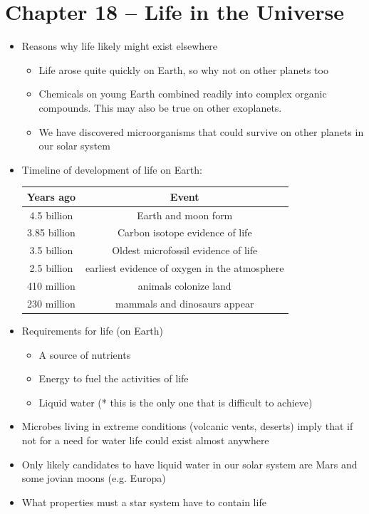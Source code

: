 \documentclass[12pt]{article}
\begin{document}
\section{Chapter 18 -- Life in the Universe}
\begin{itemize}
\item Reasons why life likely might exist elsewhere
\begin{itemize}
\item Life arose quite quickly on Earth, so why not on other planets too
\item Chemicals on young Earth combined readily into complex organic compounds.  This may also be true on other exoplanets.
\item We have discovered microorganisms that could survive on other planets in our solar system
\end{itemize}
\item Timeline of development of life on Earth:\\
    \begin{tabular}{|c|c|}
    \hline
    Years ago & Event \\ \hline
    4.5 billion & Earth and moon form\\
    3.85 billion & Carbon isotope evidence of life\\
    3.5 billion & Oldest microfossil evidence of life\\
    2.5 billion & earliest evidence of oxygen in the atmosphere\\
    410 million & animals colonize land\\
    230 million & mammals and dinosaurs appear \\ \hline
    \end{tabular}
\item Requirements for life (on Earth)
\begin{itemize}
\item A source of nutrients
\item Energy to fuel the activities of life
\item Liquid water (* this is the only one that is difficult to achieve)
\end{itemize}
\item Microbes living in extreme conditions (volcanic vents, deserts) imply that if not for a need for water life could exist almost anywhere
\item Only likely candidates to have liquid water in our solar system are Mars and some jovian moons (e.g. Europa)
\item What properties must a star system have to contain life

\end{itemize}
\end{document}
